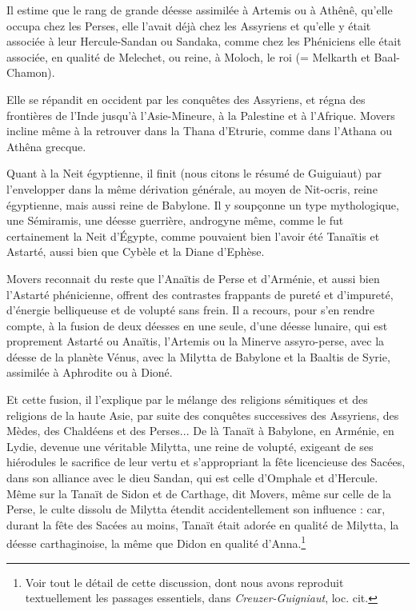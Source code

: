\documentclass[letterpaper,twocolumn,openany,nodeprecatedcode]{dndbook}
\begin{document}
Il estime que le rang de grande déesse assimilée à Artemis ou à Athênê, qu'elle occupa chez les Perses, elle l'avait déjà chez les Assyriens et qu'elle y était associée à leur Hercule-Sandan ou Sandaka, comme chez les Phéniciens elle était associée, en qualité de Melechet, ou reine, à Moloch, le roi (= Melkarth et Baal-Chamon).

Elle se répandit en occident par les conquêtes des Assyriens, et régna des frontières de l'Inde jusqu'à l'Asie-Mineure, à la Palestine et à l'Afrique. Movers incline même à la retrouver dans la Thana d'Etrurie, comme dans l'Athana ou Athêna grecque.

Quant à la Neit égyptienne, il finit (nous citons le résumé de Guiguiaut) par l'envelopper dans la même dérivation générale, au moyen de Nit-ocris, reine égyptienne, mais aussi reine de Babylone. Il y soupçonne un type mythologique, une Sémiramis, une déesse guerrière, androgyne même, comme le fut certainement la Neit d'Égypte, comme pouvaient bien l'avoir été Tanaïtis et Astarté, aussi bien que Cybèle et la Diane d'Ephèse.

Movers reconnait du reste que l'Anaïtis de Perse et d'Arménie, et aussi bien l'Astarté phénicienne, offrent des contrastes frappants de pureté et d'impureté, d'énergie belliqueuse et de volupté sans frein. Il a recours, pour s'en rendre compte, à la fusion de deux déesses en une seule, d'une déesse lunaire, qui est proprement Astarté ou Anaïtis, l'Artemis ou la Minerve assyro-perse, avec la déesse de la planète Vénus, avec la Milytta de Babylone et la Baaltis de Syrie, assimilée à Aphrodite ou à Dioné.

Et cette fusion, il l'explique par le mélange des religions sémitiques et des religions de la haute Asie, par suite des conquêtes successives des Assyriens, des Mèdes, des Chaldéens et des Perses... De là Tanaït à Babylone, en Arménie, en Lydie, devenue une véritable Milytta, une reine de volupté, exigeant de ses hiérodules le sacrifice de leur vertu et s'appropriant la fête licencieuse des Sacées, dans son alliance avec le dieu Sandan, qui est celle d'Omphale et d'Hercule. Même sur la Tanaït de Sidon et de Carthage, dit Movers, même sur celle de la Perse, le culte dissolu de Milytta étendit accidentellement son influence : car, durant la fête des Sacées au moins, Tanaït était adorée en qualité de Milytta, la déesse carthaginoise, la même que Didon en qualité d'Anna.\footnote{Voir tout le détail de cette discussion, dont nous avons reproduit textuellement les passages essentiels, dans \emph{Creuzer-Guigniaut}, loc. cit.}
\end{document}

